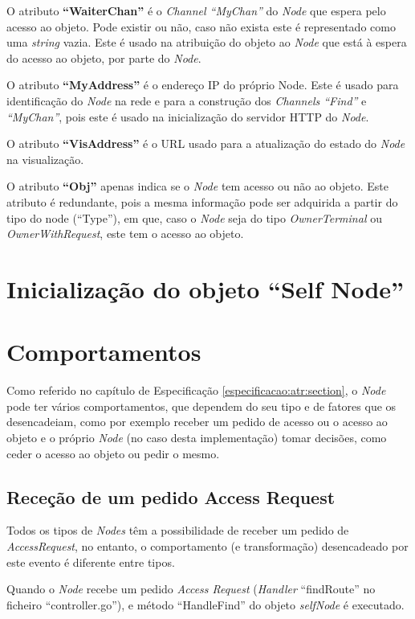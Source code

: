 O atributo \textbf{``WaiterChan''} é o \emph{Channel ``MyChan''} do \emph{Node} que espera pelo acesso ao objeto. Pode existir ou não, caso não exista este é representado como uma \emph{string} vazia.
Este é usado na atribuição do objeto ao \emph{Node} que está à espera do acesso ao objeto, por parte do \emph{Node}.

O atributo \textbf{``MyAddress''} é o endereço \acs{IP} do próprio Node. 
Este é usado para identificação do \emph{Node} na rede e para a construção dos \emph{Channels ``Find''} e \emph{``MyChan''},
pois este é usado na inicialização do servidor \acs{HTTP} do \emph{Node}.

O atributo \textbf{``VisAddress''} é o \acs{URL} usado para a atualização do estado do \emph{Node} na visualização.

O atributo \textbf{``Obj''} apenas indica se o \emph{Node} tem acesso ou não ao objeto.
Este atributo é redundante, pois a mesma informação pode ser adquirida a partir do tipo do node (``Type''), 
em que, caso o \emph{Node} seja do tipo \emph{OwnerTerminal} ou \emph{OwnerWithRequest}, este tem o acesso ao objeto.

\section{Inicialização do objeto ``Self Node''}

\section{Comportamentos}
Como referido no capítulo de Especificação \ref{especificacao:atr:section}, 
o \emph{Node} pode ter vários comportamentos, 
que dependem do seu tipo e de fatores que os desencadeiam, como por exemplo receber um pedido de acesso ou o acesso ao objeto e 
o próprio \emph{Node} (no caso desta implementação) tomar decisões, como ceder o acesso ao objeto ou pedir o mesmo.


\subsection{Receção de um pedido Access Request}
Todos os tipos de \emph{Nodes} têm a possibilidade de receber um pedido de \emph{AccessRequest}, no entanto, o comportamento (e transformação) desencadeado por este evento é diferente entre tipos.

Quando o \emph{Node} recebe um pedido \emph{Access Request} (\emph{Handler} ``findRoute'' no ficheiro ``controller.go''), e método ``HandleFind'' do objeto \emph{selfNode} é executado.

